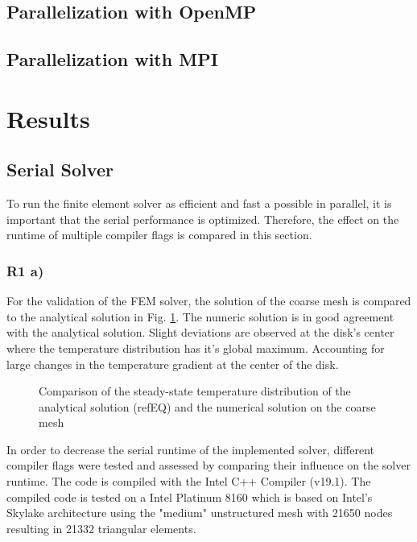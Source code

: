 \documentclass[a4paper, 11pt, oneside]{scrartcl}
\newcommand{\refFig}[1]{Fig. \ref{#1}}
\begin{document}
\subsection*{Parallelization with OpenMP}

\subsection*{Parallelization with MPI}

\section{Results}

\subsection{Serial Solver}

To run the finite element solver as efficient and fast a possible in parallel, it is important that the serial performance is optimized. Therefore, the effect on the runtime of multiple compiler flags is compared in this section.

\subsubsection*{R1 a)}
For the validation of the FEM solver, the solution of the coarse mesh is compared to the analytical solution in \refFig{fig::TemperatureDist}. The numeric solution is in good agreement with the analytical solution. Slight deviations are observed at the disk's center where the temperature distribution has it's global maximum. Accounting for large changes in the temperature gradient at the center of the disk. 

\begin{figure}[!htbp]
	\centering
	\leavevmode
	\resizebox{0.8\width}{!}{}
	\caption{Comparison of the steady-state temperature distribution of the analytical solution (refEQ) and the numerical solution on the coarse mesh}
	\label{fig::TemperatureDist}
\end{figure}

In order to decrease the serial runtime of the implemented solver, different compiler flags were tested and assessed by comparing their influence on the solver runtime. The code is compiled with the Intel C++ Compiler (v19.1). The compiled code is tested on a Intel Platinum 8160 which is based on Intel's Skylake architecture using the "medium" unstructured mesh with 21650 nodes resulting in 21332 triangular elements.
\end{document}
